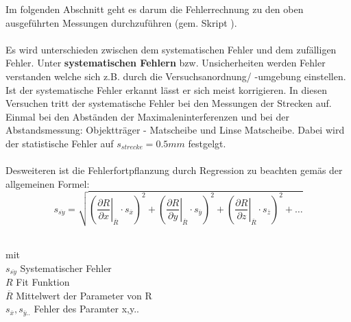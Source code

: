 Im folgenden Abschnitt geht es darum die Fehlerrechnung zu den oben ausgeführten Messungen durchzuführen (gem. Skript \cite{LOOSER2013}).\\
\\
Es wird unterschieden zwischen dem systematischen Fehler und dem zufälligen
Fehler. Unter \textbf{systematischen Fehlern} bzw. Unsicherheiten werden Fehler
verstanden welche sich z.B. durch die Versuchsanordnung/ -umgebung einstellen. Ist der systematische Fehler erkannt lässt er sich meist korrigieren. In diesen Versuchen tritt der systematische Fehler bei den Messungen der Strecken auf. Einmal bei den Abständen der Maximaleninterferenzen und bei der Abstandsmessung: Objektträger - Matscheibe und Linse Matscheibe. Dabei wird der statistische Fehler auf $s_{strecke} = 0.5mm$ festgelgt.\\
\\
Desweiteren ist die Fehlerfortpflanzung durch Regression zu beachten gemäs der allgemeinen Formel:
\begin{equation}
s_{\overline{sy}} = \sqrt{\left(\left. \frac{\partial R}{\partial x}\right|_{\overline{R}} \cdot s_{\overline{x}}\right)^{2} + \left(\left. \frac{\partial R}{\partial y}\right|_{\overline{R}} \cdot s_{\overline{y}}\right)^{2} + \left(\left. \frac{\partial R}{\partial z}\right|_{\overline{R}} \cdot s_{\overline{z}}\right)^{2} + \dots}
\label{eq:fortpflanzungsgesetz}
\end{equation}
\begin{tabbing}
\hspace{40mm}			\=   \\
mit		\>					\\
$s_{\overline{sy}}$		\>  Systematischer Fehler\\
$R$	\> Fit Funktion		\\
$\overline{R}$ 	\> Mittelwert der Parameter von R		\\
$s_{\overline{x}},s_{\overline{y}..}$	\> Fehler des Paramter x,y..\\
\end{tabbing}


